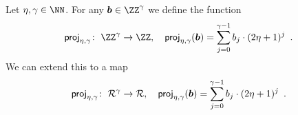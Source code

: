 \begin{definition}\label{def:proj}
  Let $\eta,\limbs\in\NN$.
  For any $\vec{b} \in \ZZ^{\limbs}$ we define the function 
  \[
    \projring\colon\; \ZZ^{\limbs} \to \ZZ,\quad \projring(\vec{b}) = \smashoperator{\sum_{j=0}^{\limbs-1}} b_j\cdot(2\eta+1)^{j}\enspace.
  \]
  We can extend this to a map 
  \[
    \projring\colon\; \ring^{\limbs} \to \ring,\quad \projring(\vec{b}) = \smashoperator{\sum_{j=0}^{\limbs-1}} b_j\cdot(2\eta+1)^{j}\enspace.
  \]
\end{definition}

